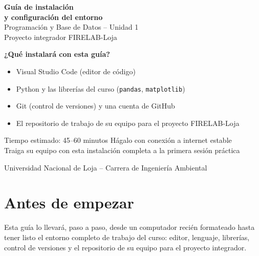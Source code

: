 \documentclass[11pt,a4paper]{article}
\newcommand{\code}[1]{\texttt{#1}}
\begin{document}

\begin{titlepage}
\centering
\vspace*{1.5cm}
{\Huge\bfseries\color{morado} Guía de instalación\\[4pt] y configuración del entorno}\\[1.2cm]
{\Large\color{moradoOsc} Programación y Base de Datos -- Unidad 1}\\[6pt]
{\large\color{grafito} Proyecto integrador FIRELAB-Loja}\\[2cm]

\begin{tcolorbox}[colback=moradoClaro!30,colframe=morado,arc=3pt,boxrule=1pt,width=0.82\textwidth,
  left=14pt,right=14pt,top=10pt,bottom=10pt]
\textbf{¿Qué instalará con esta guía?}
\begin{itemize}[itemsep=3pt]
  \item Visual Studio Code (editor de código)
  \item Python y las librerías del curso (\code{pandas}, \code{matplotlib})
  \item Git (control de versiones) y una cuenta de GitHub
  \item El repositorio de trabajo de su equipo para el proyecto FIRELAB-Loja
\end{itemize}
\end{tcolorbox}

\vspace{1.3cm}
{\small\color{grafito} Tiempo estimado: 45--60 minutos \quad\textbullet\quad Hágalo con conexión a internet estable}\\[0.4cm]
{\small\color{grafito} Traiga su equipo con esta instalación completa a la primera sesión práctica}

\vfill
{\small\color{grafito} Universidad Nacional de Loja -- Carrera de Ingeniería Ambiental}
\end{titlepage}

\tableofcontents
\newpage

\section{Antes de empezar}

Esta guía lo llevará, paso a paso, desde un computador recién formateado hasta tener listo el entorno completo de trabajo del curso: editor, lenguaje, librerías, control de versiones y el repositorio de su equipo para el proyecto integrador.
\end{document}
